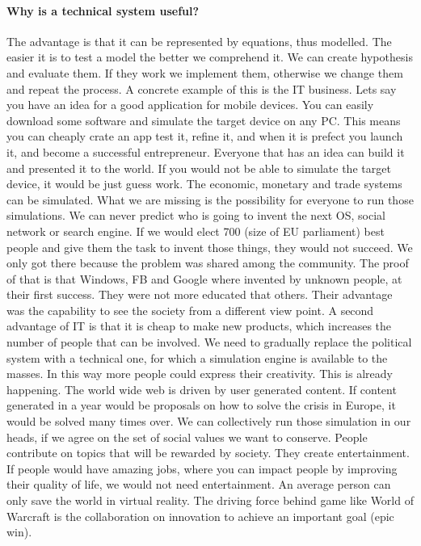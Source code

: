 \documentclass{article}
\begin{document}
\paragraph{Why is a technical system useful?}
The advantage is that it can be represented by equations, thus modelled.
The easier it is to test a model the better we comprehend it.
We can create hypothesis and evaluate them.
If they work we implement them, otherwise we change them and repeat the process.
A concrete example of this is the IT business.
Lets say you have an idea for a good application for mobile devices.
You can easily download some software and simulate the target device on any PC.
This means you can cheaply crate an app test it, refine it, and when it is prefect you launch it, and become a successful entrepreneur.
Everyone that has an idea can build it and presented it to the world.
If you would not be able to simulate the target device, it would be just guess work.
The economic, monetary and trade systems can be simulated.
What we are missing is the possibility for everyone to run those simulations.
We can never predict who is going to invent the next OS, social network or search engine.
If we would elect 700 (size of EU parliament) best people and give them the task to invent those things, they would not succeed.
We only got there because the problem was shared among the community.
The proof of that is that Windows, FB and Google where invented by unknown people, at  their first success.
They were not more educated that others.
Their advantage was the capability to see the society from a different view point.
A second advantage of IT is that it is cheap to make new products, which increases the number of people that can be involved.
We need to gradually replace the political system with a technical one, for which a simulation engine is available to the masses.
In this way more people could express their creativity.
This is already happening.
The world wide web is driven by user generated content.
If content generated in a year would be proposals on how to solve the crisis in Europe, it would be solved many times over.
We can collectively run those simulation in our heads, if we agree on the set of social values we want to conserve.
People contribute on topics that will be rewarded by society.
They create entertainment.
If people would have amazing jobs, where you can impact people by improving their quality of life, we would not need entertainment.
An average person can only save the world in virtual reality.
The driving force behind game like  World of Warcraft \cite{gaming} is the collaboration on innovation to achieve an important goal (epic win).
\end{document}
